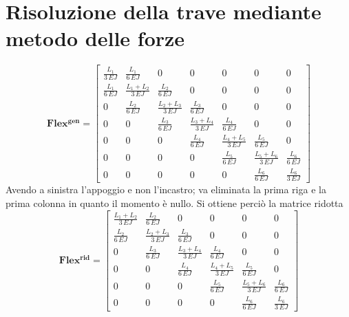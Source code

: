 \section{Risoluzione della trave mediante metodo delle forze}
\begin{equation}
\mathbf{Flex^{gen}}=
\begin{bmatrix}
\frac{L_{1}}{3 \, \mathit{EJ}} & \frac{L_{1}}{6 \, \mathit{EJ}} & 0 & 0 & 0 & 0 & 0 \\
\frac{L_{1}}{6 \, \mathit{EJ}} & \frac{L_{1} + L_{2}}{3 \, \mathit{EJ}} & \frac{L_{2}}{6 \, \mathit{EJ}} & 0 & 0 & 0 & 0 \\
0 & \frac{L_{2}}{6 \, \mathit{EJ}} & \frac{L_{2} + L_{3}}{3 \, \mathit{EJ}} & \frac{L_{3}}{6 \, \mathit{EJ}} & 0 & 0 & 0 \\
0 & 0 & \frac{L_{3}}{6 \, \mathit{EJ}} & \frac{L_{3} + L_{4}}{3 \, \mathit{EJ}} & \frac{L_{4}}{6 \, \mathit{EJ}} & 0 & 0 \\
0 & 0 & 0 & \frac{L_{4}}{6 \, \mathit{EJ}} & \frac{L_{4} + L_{5}}{3 \, \mathit{EJ}} & \frac{L_{5}}{6 \, \mathit{EJ}} & 0 \\
0 & 0 & 0 & 0 & \frac{L_{5}}{6 \, \mathit{EJ}} & \frac{L_{5} + L_{6}}{3 \, \mathit{EJ}} & \frac{L_{6}}{6 \, \mathit{EJ}} \\
0 & 0 & 0 & 0 & 0 & \frac{L_{6}}{6 \, \mathit{EJ}} & \frac{L_{6}}{3 \, \mathit{EJ}}
\end{bmatrix}
\end{equation}
Avendo a sinistra l'appoggio e non l'incastro; va eliminata la prima riga e la prima colonna in quanto il momento è nullo.
Si ottiene perciò la matrice ridotta
\begin{equation}
\mathbf{Flex^{rid}}=
\begin{bmatrix}
\frac{L_{1} + L_{2}}{3 \, \mathit{EJ}} & \frac{L_{2}}{6 \, \mathit{EJ}} & 0 & 0 & 0 & 0 \\
\frac{L_{2}}{6 \, \mathit{EJ}} & \frac{L_{2} + L_{3}}{3 \, \mathit{EJ}} & \frac{L_{3}}{6 \, \mathit{EJ}} & 0 & 0 & 0 \\
0 & \frac{L_{3}}{6 \, \mathit{EJ}} & \frac{L_{3} + L_{4}}{3 \, \mathit{EJ}} & \frac{L_{4}}{6 \, \mathit{EJ}} & 0 & 0 \\
0 & 0 & \frac{L_{4}}{6 \, \mathit{EJ}} & \frac{L_{4} + L_{5}}{3 \, \mathit{EJ}} & \frac{L_{5}}{6 \, \mathit{EJ}} & 0 \\
0 & 0 & 0 & \frac{L_{5}}{6 \, \mathit{EJ}} & \frac{L_{5} + L_{6}}{3 \, \mathit{EJ}} & \frac{L_{6}}{6 \, \mathit{EJ}} \\
0 & 0 & 0 & 0 & \frac{L_{6}}{6 \, \mathit{EJ}} & \frac{L_{6}}{3 \, \mathit{EJ}}
\end{bmatrix}
\end{equation}
